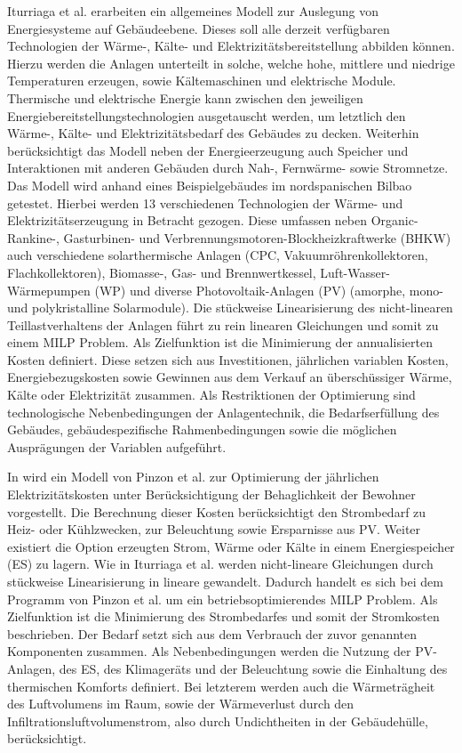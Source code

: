 Iturriaga et al. \cite{Iturriaga.2017} erarbeiten ein allgemeines Modell zur Auslegung von Energiesysteme auf Gebäudeebene. 
Dieses soll alle derzeit verfügbaren Technologien der Wärme-, Kälte- und Elektrizitätsbereitstellung abbilden können.
Hierzu werden die Anlagen unterteilt in solche, welche hohe, mittlere und niedrige Temperaturen erzeugen, sowie Kältemaschinen und elektrische Module.
Thermische und elektrische Energie kann zwischen den jeweiligen Energiebereitstellungstechnologien ausgetauscht werden, um letztlich den Wärme-, Kälte- und Elektrizitätsbedarf des Gebäudes zu decken.
Weiterhin berücksichtigt das Modell neben der Energieerzeugung auch Speicher und Interaktionen mit anderen Gebäuden durch Nah-, Fernwärme- sowie Stromnetze.
Das Modell wird anhand eines Beispielgebäudes im nordspanischen Bilbao getestet.
Hierbei werden 13 verschiedenen Technologien der Wärme- und Elektrizitätserzeugung in Betracht gezogen.
Diese umfassen neben Organic-Rankine-, Gasturbinen- und Verbrennungsmotoren-Blockheizkraftwerke (BHKW) auch verschiedene solarthermische Anlagen (CPC, Vakuumröhrenkollektoren, Flachkollektoren), Biomasse-, Gas- und Brennwertkessel, Luft-Wasser-Wärmepumpen (WP) und diverse Photovoltaik-Anlagen (PV) (amorphe, mono- und polykristalline Solarmodule).
Die stückweise Linearisierung des nicht-linearen Teillastverhaltens der Anlagen führt zu rein linearen Gleichungen und somit zu einem MILP Problem.
Als Zielfunktion ist die Minimierung der annualisierten Kosten definiert. 
Diese setzen sich aus Investitionen, jährlichen variablen Kosten, Energiebezugskosten sowie Gewinnen aus dem Verkauf an überschüssiger Wärme, Kälte oder Elektrizität zusammen.
Als Restriktionen der Optimierung sind technologische Nebenbedingungen der Anlagentechnik, die Bedarfserfüllung des Gebäudes, gebäudespezifische Rahmenbedingungen sowie die möglichen Ausprägungen der Variablen aufgeführt.

In \cite{Pinzon.23.04.201726.04.2017} wird ein Modell von Pinzon et al. zur Optimierung der jährlichen Elektrizitätskosten unter Berücksichtigung der Behaglichkeit der Bewohner vorgestellt.
Die Berechnung dieser Kosten berücksichtigt den Strombedarf zu Heiz- oder Kühlzwecken, zur Beleuchtung sowie Ersparnisse aus PV.
Weiter existiert die Option erzeugten Strom, Wärme oder Kälte in einem Energiespeicher (ES) zu lagern.
Wie in Iturriaga et al. \cite{Iturriaga.2017} werden nicht-lineare Gleichungen durch stückweise Linearisierung in lineare gewandelt.
Dadurch handelt es sich bei dem Programm von Pinzon et al. um ein betriebsoptimierendes MILP Problem.
Als Zielfunktion ist die Minimierung des Strombedarfes und somit der Stromkosten beschrieben.
Der Bedarf setzt sich aus dem Verbrauch der zuvor genannten Komponenten zusammen.
Als Nebenbedingungen werden die Nutzung der PV-Anlagen, des ES, des Klimageräts und der Beleuchtung sowie die Einhaltung des thermischen Komforts definiert.
Bei letzterem werden auch die Wärmeträgheit des Luftvolumens im Raum, sowie der Wärmeverlust durch den Infiltrationsluftvolumenstrom, also durch Undichtheiten in der Gebäudehülle, berücksichtigt.

